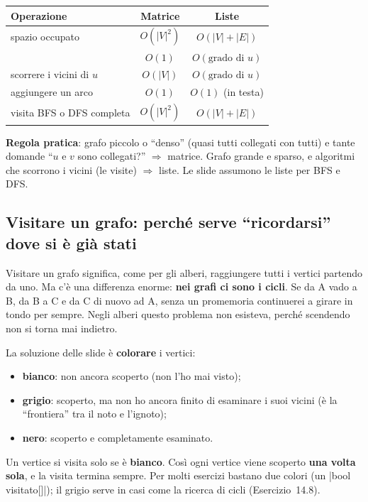 \begin{center}
\begin{tabular}{lcc}
\toprule
\textbf{Operazione} & \textbf{Matrice} & \textbf{Liste} \\
\midrule
spazio occupato                    & $O(|V|^2)$     & $O(|V| + |E|)$ \\
\q{c'è l'arco $(u,v)$?}            & $O(1)$         & $O(\text{grado di } u)$ \\
scorrere i vicini di $u$           & $O(|V|)$       & $O(\text{grado di } u)$ \\
aggiungere un arco                 & $O(1)$         & $O(1)$ (in testa) \\
visita BFS o DFS completa          & $O(|V|^2)$     & $O(|V| + |E|)$ \\
\bottomrule
\end{tabular}
\end{center}
\textbf{Regola pratica}: grafo piccolo o ``denso'' (quasi tutti collegati con tutti) e
tante domande ``$u$ e $v$ sono collegati?'' $\Rightarrow$ matrice. Grafo grande e
sparso, e algoritmi che scorrono i vicini (le visite) $\Rightarrow$ liste. Le slide
assumono le liste per BFS e DFS.

\subsection*{Visitare un grafo: perché serve ``ricordarsi'' dove si è già stati}

Visitare un grafo significa, come per gli alberi, raggiungere tutti i vertici partendo da
uno. Ma c'è una differenza enorme: \textbf{nei grafi ci sono i cicli}. Se da A vado a B,
da B a C e da C di nuovo ad A, senza un promemoria continuerei a girare in tondo per
sempre. Negli alberi questo problema non esisteva, perché scendendo non si torna mai
indietro.

La soluzione delle slide è \textbf{colorare} i vertici:
\begin{itemize}
  \item \textbf{bianco}: non ancora scoperto (non l'ho mai visto);
  \item \textbf{grigio}: scoperto, ma non ho ancora finito di esaminare i suoi vicini (è
        la ``frontiera'' tra il noto e l'ignoto);
  \item \textbf{nero}: scoperto e completamente esaminato.
\end{itemize}
Un vertice si visita solo se è \textbf{bianco}. Così ogni vertice viene scoperto
\textbf{una volta sola}, e la visita termina sempre. Per molti esercizi bastano due colori
(un \cc|bool visitato[]|); il grigio serve in casi come la ricerca di cicli
(Esercizio~14.8).

